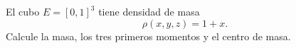 El cubo $E=[0,1]^3$ tiene densidad de masa
\[
\rho(x,y,z)=1+x.
\]
Calcule la masa, los tres primeros momentos y el centro de masa.
